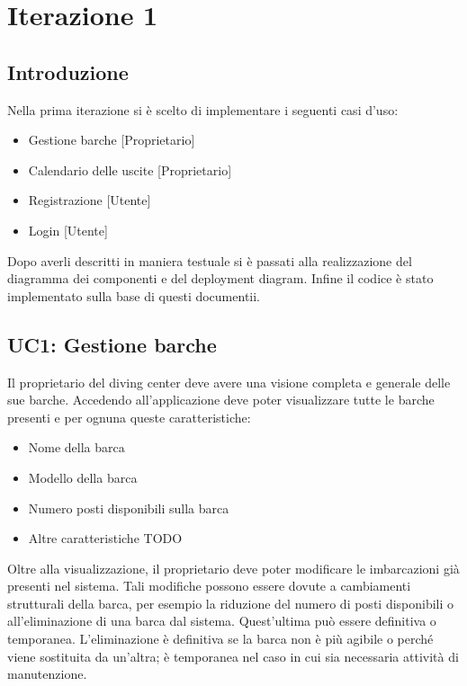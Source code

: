 \chapter{Iterazione 1}

\section{Introduzione}
Nella prima iterazione si è scelto di implementare i seguenti casi d'uso:

\begin{itemize}
    \item Gestione barche [Proprietario]
    \item Calendario delle uscite [Proprietario]
    \item Registrazione [Utente]
    \item Login [Utente]
\end{itemize}
Dopo averli descritti in maniera testuale si è passati alla realizzazione del diagramma dei componenti e del deployment diagram. Infine il codice è stato implementato sulla base di questi documentii.

\section{UC1: Gestione barche}
Il proprietario del diving center deve avere una visione completa e generale delle sue barche.
Accedendo all'applicazione deve poter visualizzare tutte le barche presenti e per ognuna queste caratteristiche:

\begin{itemize}
    \item Nome della barca
    \item Modello della barca
    \item Numero posti disponibili sulla barca
    \item Altre caratteristiche TODO
\end{itemize}

Oltre alla visualizzazione, il proprietario deve poter modificare le imbarcazioni già presenti nel sistema.
Tali modifiche possono essere dovute a cambiamenti strutturali della barca, per esempio la riduzione del numero di posti disponibili
o all'eliminazione di una barca dal sistema.
Quest'ultima può essere definitiva o temporanea. L'eliminazione è definitiva se la barca non è più agibile o perché viene sostituita da un'altra;
è temporanea nel caso in cui sia necessaria attività di manutenzione.

